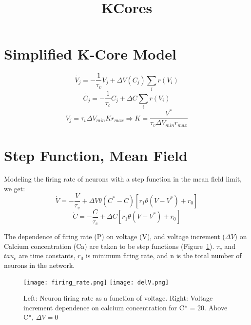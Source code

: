 \documentclass[11pt,letterpaper]{article}
\title{KCores}
\begin{document}

\maketitle


\section*{Simplified K-Core Model}
\begin{equation}\label{eq:kcore}
\dot{V_j} = -\frac{1}{\tau _v} V_j + \Delta V(C_j) \sum_i r(V_i)
\end{equation}
\begin{equation}\label{eq:kcore2}
\dot{C_j} = -\frac{1}{\tau _c} C_j + \Delta C \sum_i r(V_i)
\end{equation}
\begin{equation}\label{eq:k_of_kcore}
V_j = \tau _v \Delta V_{min} K r_{max} \Rightarrow K = \frac{V^*}{\tau _v \Delta V_{min} r_{max}} 
\end{equation}


\section*{Step Function, Mean Field}
Modeling the firing rate of neurons with a step function in the mean field limit, we get: 
\begin{equation}\label{eq:step_mean_field}
\dot{V} = -\frac{V}{\tau _v} + \Delta V \theta (C^* - C)[r_1\theta (V - V^*) + r_0]
\end{equation}
\begin{equation}
\dot{C} = -\frac{C}{\tau _c} + \Delta C [r_1 \theta (V - V^*) + r_0]
\end{equation}

The dependence of firing rate (P) on voltage (V), and voltage increment ($\Delta V$) on Calcium concentration (Ca) are taken to be step functions (Figure~\ref{fig:step_function}). $\tau _v$ and $tau _c$ are time constants, $r_0$ is minimum firing rate, and n is the total number of neurons in the network. 

\begin{figure}[!h]
  \centering
  	\texttt{[image: firing\_rate.png]}
    \texttt{[image: delV.png]}
  \caption{Left: Neuron firing rate as a function of voltage. Right: Voltage increment dependence on calcium concentration for C* = 20. Above C*, $\Delta V = 0$}
  \label{fig:step_function}
\end{figure}
\end{document}
